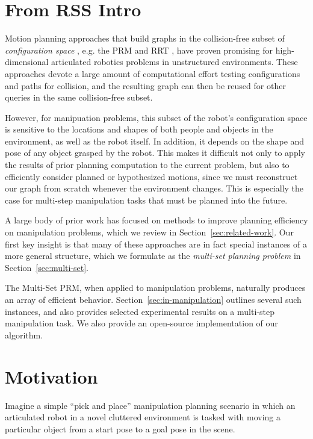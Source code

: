 \documentclass{report}
\begin{document}
\section{From RSS Intro}

Motion planning approaches that build graphs
in the collision-free subset of
\emph{configuration space} \cite{lozanoperez1983cspace},
e.g. the
PRM \cite{kavrakietal1996prm}
and RRT \cite{lavallekuffner1999rrt},
have proven promising
for high-dimensional articulated robotics problems
in unstructured environments.
These approaches devote a large amount of computational effort
testing configurations and paths for collision,
and the resulting graph can then be reused
for other queries in the same collision-free subset.

However,
for manipuation problems,
this subset of the robot's configuration space
is sensitive to the locations and shapes of
both people and objects in the environment,
as well as the robot itself.
In addition, it depends on the shape and pose of any object
grasped by the robot.
This makes it difficult not only to apply the results of prior
planning computation to the current problem,
but also to efficiently consider planned or hypothesized motions,
since we must reconstruct our graph from scratch whenever
the environment changes.
This is especially the case for
multi-step manipulation tasks that must be planned into the future.

A large body of prior work has focused on methods to
improve planning efficiency on manipulation problems,
which we review in Section~\ref{sec:related-work}.
Our first key insight is that many of these approaches are
in fact special instances of a more general structure,
which we formulate as the \emph{multi-set planning problem}
in Section~\ref{sec:multi-set}.

The Multi-Set PRM,
when applied to manipulation problems,
naturally produces an array of efficient behavior.
Section~\ref{sec:in-manipulation} outlines several such instances,
and also provides selected experimental results
on a multi-step manipulation task.
We also provide an open-source implementation of our algorithm.

\section{Motivation}

Imagine a simple ``pick and place'' manipulation planning scenario
in which an articulated robot in a novel cluttered environment
is tasked with moving a particular object from a start pose to a goal
pose in the scene.
\end{document}
